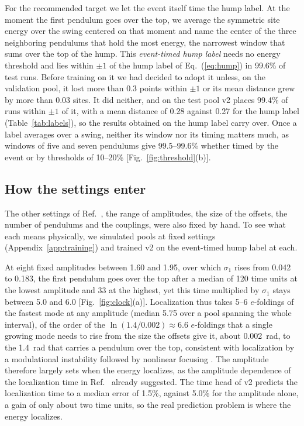 \documentclass[11pt]{article}
\begin{document}
For the recommended target we let the event itself time the hump label. At the moment the first pendulum goes over the top, we average the symmetric site energy over the swing centered on that moment and name the center of the three neighboring pendulums that hold the most energy, the narrowest window that sums over the top of the hump. This \emph{event-timed hump label} needs no energy threshold and lies within $\pm1$ of the hump label of Eq.~(\ref{eq:hump}) in 99.6\% of test runs. Before training on it we had decided to adopt it unless, on the validation pool, it lost more than 0.3 points within $\pm1$ or its mean distance grew by more than 0.03 sites. It did neither, and on the test pool v2 places 99.4\% of runs within $\pm1$ of it, with a mean distance of 0.28 against 0.27 for the hump label (Table~\ref{tab:labels}), so the results obtained on the hump label carry over. Once a label averages over a swing, neither its window nor its timing matters much, as windows of five and seven pendulums give 99.5--99.6\% whether timed by the event or by thresholds of 10--20\% [Fig.~\ref{fig:threshold}(b)].

\subsection{How the settings enter}
\label{sec:settings}

The other settings of Ref.~\cite{mittal2026jand}, the range of amplitudes, the size of the offsets, the number of pendulums and the couplings, were also fixed by hand. To see what each means physically, we simulated pools at fixed settings (Appendix~\ref{app:training}) and trained v2 on the event-timed hump label at each.

At eight fixed amplitudes between 1.60 and 1.95, over which $\sigma_1$ rises from 0.042 to 0.183, the first pendulum goes over the top after a median of 120 time units at the lowest amplitude and 33 at the highest, yet this time multiplied by $\sigma_1$ stays between 5.0 and 6.0 [Fig.~\ref{fig:clock}(a)]. Localization thus takes 5--6 $e$-foldings of the fastest mode at any amplitude (median 5.75 over a pool spanning the whole interval), of the order of the $\ln(1.4/0.002)\approx6.6$ $e$-foldings that a single growing mode needs to rise from the size the offsets give it, about 0.002~rad, to the 1.4~rad that carries a pendulum over the top, consistent with localization by a modulational instability followed by nonlinear focusing \cite{dauxois1993energy,daumont1997modulational}. The amplitude therefore largely sets when the energy localizes, as the amplitude dependence of the localization time in Ref.~\cite{mittal2026jand} already suggested. The time head of v2 predicts the localization time to a median error of 1.5\%, against 5.0\% for the amplitude alone, a gain of only about two time units, so the real prediction problem is where the energy localizes.
\end{document}
